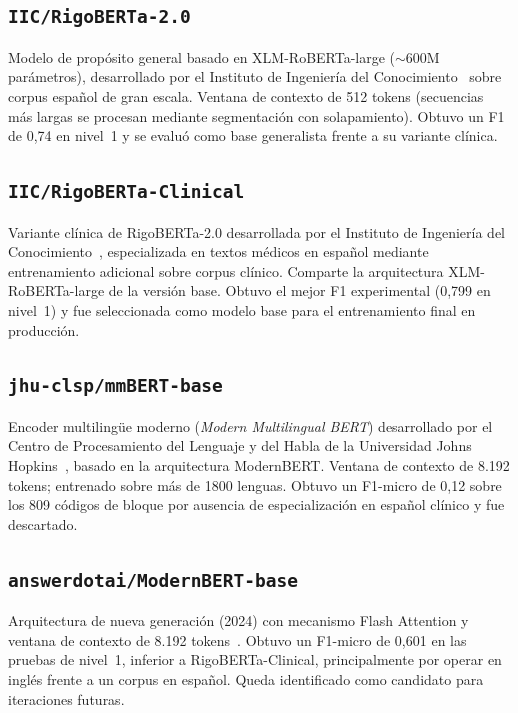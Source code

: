 \subsection{\texttt{IIC/RigoBERTa-2.0}}

Modelo de propósito general basado en XLM-RoBERTa-large ($\sim$600M parámetros), desarrollado por el Instituto de Ingeniería del Conocimiento~\cite{vacaserrano2022rigoberta} sobre corpus español de gran escala. Ventana de contexto de 512 tokens (secuencias más largas se procesan mediante segmentación con solapamiento). Obtuvo un F1 de 0{,}74 en nivel~1 y se evaluó como base generalista frente a su variante clínica.

\subsection{\texttt{IIC/RigoBERTa-Clinical}}

Variante clínica de RigoBERTa-2.0 desarrollada por el Instituto de Ingeniería del Conocimiento~\cite{garciasubies2026rigobertaclinical}, especializada en textos médicos en español mediante entrenamiento adicional sobre corpus clínico. Comparte la arquitectura XLM-RoBERTa-large de la versión base. Obtuvo el mejor F1 experimental (0{,}799 en nivel~1) y fue seleccionada como modelo base para el entrenamiento final en producción.

\subsection{\texttt{jhu-clsp/mmBERT-base}}

Encoder multilingüe moderno (\emph{Modern Multilingual BERT}) desarrollado por el Centro de Procesamiento del Lenguaje y del Habla de la Universidad Johns Hopkins~\cite{marone2025mmbert}, basado en la arquitectura ModernBERT. Ventana de contexto de 8.192 tokens; entrenado sobre más de 1800 lenguas. Obtuvo un F1-micro de 0{,}12 sobre los 809 códigos de bloque por ausencia de especialización en español clínico y fue descartado.

\subsection{\texttt{answerdotai/ModernBERT-base}}

Arquitectura de nueva generación (2024) con mecanismo Flash Attention y ventana de contexto de 8.192 tokens~\cite{warner2024modernbert}. Obtuvo un F1-micro de 0{,}601 en las pruebas de nivel~1, inferior a RigoBERTa-Clinical, principalmente por operar en inglés frente a un corpus en español. Queda identificado como candidato para iteraciones futuras.

